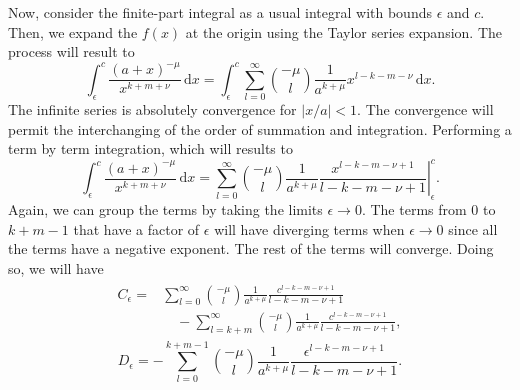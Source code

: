 Now, consider the finite-part integral as a usual integral with bounds $\epsilon$ and $c$. Then, we expand the $f(x)$ at the origin using the Taylor series expansion. The process will result to
\begin{equation}
    \int_{\epsilon}^{c}  \frac{(a+x)^{-\mu}}{x^{k+m+\nu}} \, \mathrm{d}x =  \int_{\epsilon}^{c} \sum_{l=0}^{\infty} \binom{-\mu}{l} \frac{1}{a^{k+\mu}} x^{l-k-m-\nu} \, \mathrm{d}x.
\end{equation}
The infinite series is absolutely convergence for $|x/a| < 1$. The convergence will permit the interchanging of the order of summation and integration. Performing a term by term integration, which will results to
\begin{equation}
    \int_{\epsilon}^{c}  \frac{(a+x)^{-\mu}}{x^{k+m+\nu}} \, \mathrm{d}x = \sum_{l=0}^{\infty} \binom{-\mu}{l} \frac{1}{a^{k+\mu}} \left. \frac{x^{l-k-m-\nu+1}}{l-k-m-\nu+1} \right|_{\epsilon}^{c}.
\end{equation}
Again, we can group the terms by taking the limits $\epsilon \to 0$. The terms from $0$ to $k+m-1$ that have a factor of $\epsilon$ will have diverging terms when $\epsilon \to 0$ since all the terms have a negative exponent. The rest of the terms will converge.  Doing so, we will have
\begin{align}
\begin{split} 
    C_\epsilon = & \sum_{l=0}^{\infty} \binom{-\mu}{l} \frac{1}{a^{k+\mu}} \frac{c^{l-k-m-\nu+1}}{l-k-m-\nu+1} \\& \quad -  \sum_{l=k+m}^{\infty} \binom{-\mu}{l} \frac{1}{a^{k+\mu}} \frac{c^{l-k-m-\nu+1}}{l-k-m-\nu+1},
\end{split}
\end{align}
\begin{equation}
    D_\epsilon =- \sum_{l=0}^{k+m-1} \binom{-\mu}{l} \frac{1}{a^{k+\mu}}  \frac{\epsilon^{l-k-m-\nu+1}}{l-k-m-\nu+1}. 
\end{equation}

